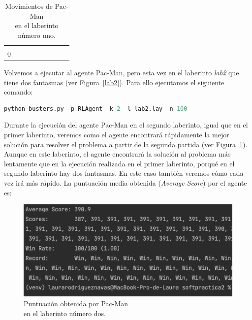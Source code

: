 \documentclass[11pt]{exam}
\begin{document}
\begin{table}[H]
\begin{tabular}{ccccccccc}
		\multicolumn{1}{c|}{} &
		\multicolumn{1}{c|}{} &
		\multicolumn{1}{c|}{} &
		\multicolumn{1}{c|}{} &
		\multicolumn{1}{c|}{} &
		\multicolumn{1}{c|}{} &
		\multicolumn{1}{c|}{\cellcolor[HTML]{000000}} \\ \cline{2-9} 
		\multicolumn{1}{c|}{0} &
		\multicolumn{1}{c|}{\cellcolor[HTML]{000000}} &
		\multicolumn{1}{c|}{\cellcolor[HTML]{000000}} &
		\multicolumn{1}{c|}{\cellcolor[HTML]{000000}} &
		\multicolumn{1}{c|}{\cellcolor[HTML]{000000}} &
		\multicolumn{1}{c|}{\cellcolor[HTML]{000000}} &
		\multicolumn{1}{c|}{\cellcolor[HTML]{000000}} &
		\multicolumn{1}{c|}{\cellcolor[HTML]{000000}} &
		\multicolumn{1}{c|}{\cellcolor[HTML]{000000}} \\ \cline{2-9} 
	\end{tabular}
	\caption{Movimientos de Pac-Man \\ en el laberinto número uno.}
	\label{tabla_lab1}
\end{table}

Volvemos a ejecutar al agente Pac-Man, pero esta vez en el laberinto \textit{lab2} que tiene dos fantasmas (ver Figura~\ref{lab2}). Para ello ejecutamos el siguiente comando:

\begin{lstlisting}[language=python, basicstyle=\footnotesize]
python busters.py -p RLAgent -k 2 -l lab2.lay -n 100
\end{lstlisting}

Durante la ejecución del agente Pac-Man en el segundo laberinto, igual que en el primer laberinto, veremos como el agente encontrará rápidamente la mejor solución para resolver el problema a partir de la segunda partida (ver Figura~\ref{result_lab2}). Aunque en este laberinto, el agente encontrará la solución al problema más lentamente que en la ejecución realizada en el primer laberinto, porqué en el segundo laberinto hay dos fantasmas. En este caso también veremos cómo cada vez irá más rápido. La puntuación media obtenida (\textit{Average Score}) por el agente es:

\begin{figure}[H]
	\centering
	\includegraphics[scale=0.65]{result_lab2}
	\caption{Puntuación obtenida por Pac-Man \\ en el laberinto número dos.}
	\label{result_lab2}
\end{figure}
\end{document}
